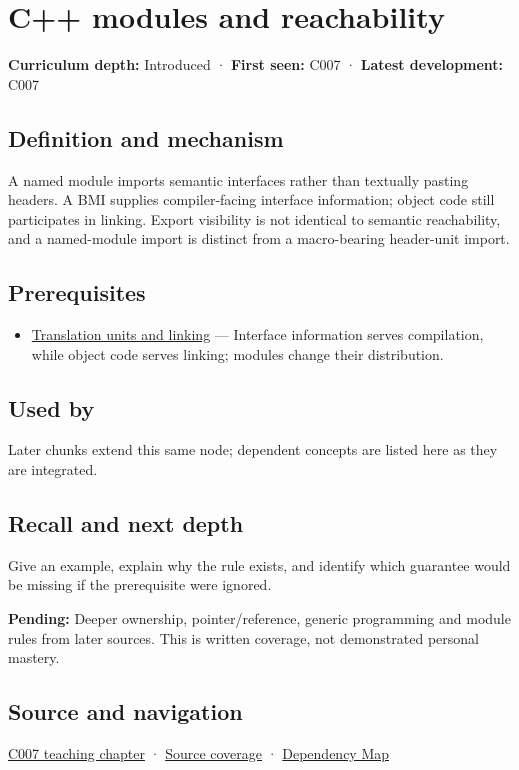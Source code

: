 \hypertarget{appendix-410a611a5b8d}{}\label{referencestart:appendix-410a611a5b8d}
\section{C++ modules and reachability}\label{appendix-410a611a5b8d-c-modules-and-reachability}

\textbf{Curriculum depth:} Introduced · \textbf{First seen:} C007 · \textbf{Latest development:} C007

\subsection{Definition and mechanism}\label{appendix-410a611a5b8d-definition-and-mechanism}

A named module imports semantic interfaces rather than textually pasting headers. A BMI supplies compiler-facing interface information; object code still participates in linking. Export visibility is not identical to semantic reachability, and a named-module import is distinct from a macro-bearing header-unit import.

\subsection{Prerequisites}\label{appendix-410a611a5b8d-prerequisites}

\begin{itemize}
\tightlist
\item
  \hyperref[appendix-806686359e1b]{Translation units and linking} --- Interface information serves compilation, while object code serves linking; modules change their distribution.
\end{itemize}

\subsection{Used by}\label{appendix-410a611a5b8d-used-by}

Later chunks extend this same node; dependent concepts are listed here as they are integrated.

\subsection{Recall and next depth}\label{appendix-410a611a5b8d-recall-and-next-depth}

Give an example, explain why the rule exists, and identify which guarantee would be missing if the prerequisite were ignored.

\textbf{Pending:} Deeper ownership, pointer/reference, generic programming and module rules from later sources. This is written coverage, not demonstrated personal mastery.

\subsection{Source and navigation}\label{appendix-410a611a5b8d-source-and-navigation}

\hyperref[01-foundations-i-ch002-giving-a-program-a-buildable-shape]{C007 teaching chapter} · \hyperref[appendix-fd090d982a15-m007---parts-101-112]{Source coverage} · \hyperref[appendix-4ad47bdd269a]{Dependency Map}
